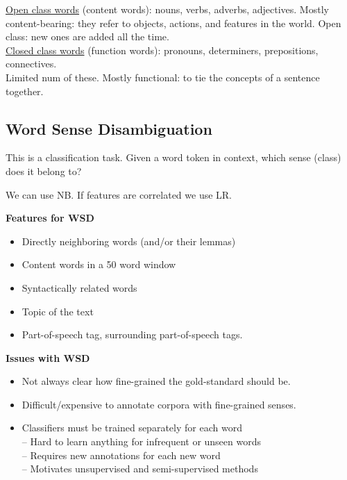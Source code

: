\documentclass[8pt]{extarticle} %
\begin{document}
\begin{multicols*}{3}
\underline{Open class words} (content words): nouns, verbs, adverbs, adjectives. Mostly content-bearing: they refer to objects, actions, and features in the world. Open class: new ones are added all the time. \\

\underline{Closed class words} (function words): pronouns, determiners, prepositions, connectives.\\
Limited num of these. Mostly functional: to tie the concepts of a sentence together.



\subsection*{Word Sense Disambiguation}
This is a classification task. Given a word token in context, which sense (class) does it belong to? 

We can use NB. If features are correlated we use LR. 

\textbf{Features for WSD}
\begin{itemize}[label=\textbullet, labelsep=0.3em, leftmargin=0.5em, itemsep=0em]
    \item Directly neighboring words (and/or their lemmas)
    \item Content words in a 50 word window
    \item Syntactically related words
    \item Topic of the text
    \item Part-of-speech tag, surrounding part-of-speech tags. 
\end{itemize}

\textbf{Issues with WSD}
\begin{itemize}[label=\textbullet, labelsep=0.3em, leftmargin=0.5em, itemsep=0em]
\item Not always clear how fine-grained the gold-standard should be.
\item Difficult/expensive to annotate corpora with fine-grained senses.
\item Classifiers must be trained separately for each word\\
– Hard to learn anything for infrequent or unseen words\\
– Requires new annotations for each new word\\
– Motivates unsupervised and semi-supervised methods\\
\end{itemize}


\end{multicols*}
\end{document}
